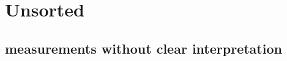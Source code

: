 \documentclass[
10pt,					%
a4paper,				%
twoside,				%
BCOR=8mm,				%
headings=normal,		%
headsepline,			%
footsepline,			%
plainfootsepline,		%
]{scrbook}
\begin{document}
\chapter{Unsorted}
   \section{measurements without clear interpretation}
      
	\printindex
\backmatter{}
	\printbibliography  
    
\end{document}
